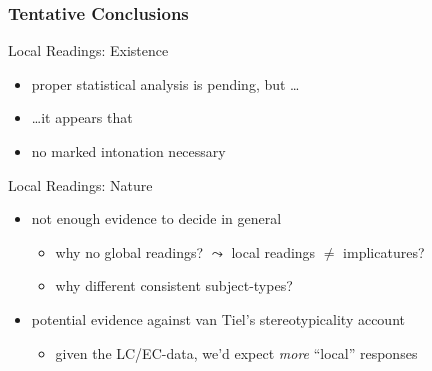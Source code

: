 \documentclass[fleqn,10pt,xcolor=dvipsnames]{beamer}
\newcommand{\LC}{LC\xspace}
\newcommand{\EC}{EC\xspace}
\newcommand{\mymark}[1]{{\color{mycol}{#1}}}
\begin{document}
\begin{frame}
  \frametitle{Tentative Conclusions}
  \begin{block}{Local Readings: Existence}
    \begin{itemize}
    \item proper statistical analysis is pending, but \dots
    \item \dots it appears that \mymark{local readings exist but are dispreferred}
    \item no marked intonation necessary
    \end{itemize}
  \end{block}
  
  \begin{block}{Local Readings: Nature}
    \begin{itemize}
    \item not enough evidence to decide in general
      \begin{itemize}
      \item why no global readings? $\leadsto$ local readings $\neq$ implicatures?
      \item why different consistent subject-types?
      \end{itemize}
    \item potential evidence against van Tiel's stereotypicality account
      \begin{itemize}
      \item given the \LC/\EC-data, we'd expect \emph{more} ``local''
        responses
      \end{itemize}
    \end{itemize}
  \end{block}

\end{frame}



\begin{frame}[plain,allowframebreaks,shrink=0.9]

    \printbibliography[heading=subbibliography]

\end{frame}
\end{document}

